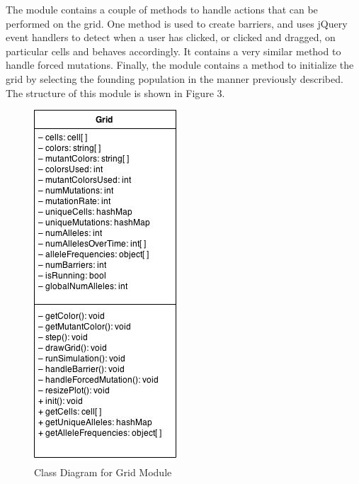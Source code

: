 \documentclass[12pt]{article}
\begin{document}
\begin{spacing}{1.6}
The module contains a couple of methods to handle actions that can be performed on the grid. One method is used to create barriers, and uses jQuery event handlers to detect when a user has clicked, or clicked and dragged, on particular cells and behaves accordingly. It contains a very similar method to handle forced mutations.\newline
\newline
Finally, the module contains a method to initialize the grid by selecting the founding population in the manner previously described. The structure of this module is shown in Figure 3.
\begin{figure}[h]
\caption{Class Diagram for Grid Module}
\centering
\includegraphics[scale=0.5]{grid-class-diagram}
\end{figure}


\end{spacing}
\end{document}
